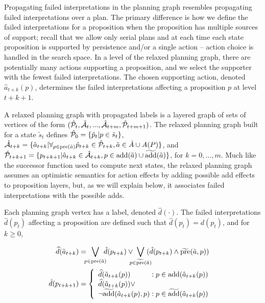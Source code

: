 \documentclass{article}
\def\und#1{\noindent{\bf #1}:}
\def\und#1{\medskip{\noindent\bf #1:}}
\begin{document}
\und{Incomplete Domain Heuristics} Propagating failed interpretations in the planning graph resembles propagating failed interpretations over a plan.  The primary difference is how we define the failed interpretations for a proposition when the proposition has multiple sources of support; recall that we allow only serial plans and at each time each state proposition is supported by persistence and/or a single action -- action choice is handled in the search space. 
In a level of the relaxed planning graph, there are potentially many actions supporting a proposition, and we select the supporter with the fewest failed interpretations. The chosen supporting action, denoted $\hat{a}_{t+k}(p)$, determines the failed interpretations affecting a proposition $p$ at level $t+k+1$.


A relaxed planning graph with propagated labels is a layered
graph of sets of vertices of the form $(\hat{\cal P}_t, \hat{\cal A}_t, ..., \hat{\cal
A}_{t+m}, \hat{\cal P}_{t+m+1})$. The relaxed planning graph built for a state $\tilde{s}_t$ defines $\hat{\cal P}_0 = \{\hat{p}_t | p \in \tilde{s}_t\}$, $\hat{\cal A}_{t+k} = \{ \hat{a}_{t+k} | \forall_{p \in \text{pre}(\tilde{a})} \hat{p}_{t+k} \in \hat{\cal P}_{t+k}, \tilde{a} \in \tilde{A} \cup A(P)\}$, and $\hat{\cal P}_{t+k+1} = \{p_{t+k+1} | \hat{a}_{t+k} \in \hat{\cal A}_{t+k}, p \in \text{add}(\tilde{a}) \cup \widetilde{\text{add}}(\tilde{a})\}$, for $k = 0, ..., m$.  Much like the successor function used to compute next states, the relaxed planning graph assumes an optimistic semantics for action effects by adding possible add effects to proposition layers, but, as we will explain below, it associates failed interpretations with the possible adds. 

 Each planning graph vertex has a label, denoted $\hat{d}(\cdot)$.  The failed interpretations $\hat{d}(p_t) $ affecting a proposition are defined such that $\hat{d}(p_t) = d(p_t)$, and for $k \geq 0$, 

\begin{align}
\widehat{d}(\tilde{a}_{t+k}) &= \hspace*{-.2cm} 
\bigvee\limits_{p \in \text{pre}(\tilde{a}) } \hspace*{-.2cm}   \hat{d}(p_{t+k}) \vee \hspace*{-.25cm} 
\bigvee\limits_{p \in \widetilde{\text{pre}}(\tilde{a})} \hspace*{-.25cm}  (\hat{d}(p_{t+k})  \wedge  \widetilde{\text{pre}}(\tilde{a}, p) )\label{eqn:hact}\\
 \hspace*{-.6cm} \hat{d}(p_{t+k+1}) &= 
\left\{\begin{array}{l@{\;}l@{\;}r}
\widehat{d}(\hat{a}_{t+k}(p)) & : p \in \text{add}(\hat{a}_{t+k}(p))\\
\widehat{d}(\hat{a}_{t+k}(p)) \vee \\
\neg\widetilde{\text{add}}(\hat{a}_{t+k}(p), p) & : p \in \widetilde{\text{add}}(\hat{a}_{t+k}(p))\end{array}\right. \hspace*{-.1cm}\label{eqn:hprop}
\end{align}
\end{document}
